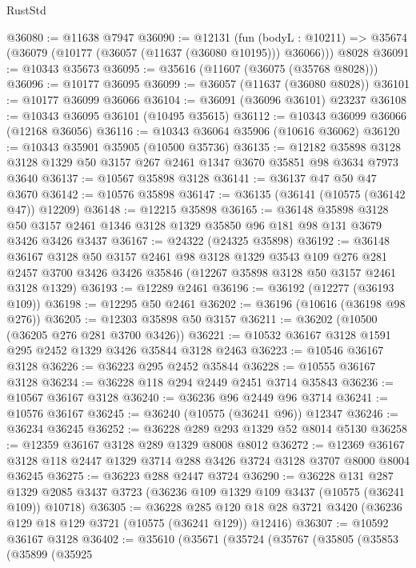\begin{lexlean}{RustStd}
\begin{coremodule}
@36080 := @11638 @7947
@36090 := @12131
    (fun (bodyL : @10211) => @35674 (@36079 (@10177 (@36057 (@11637 (@36080 @10195))) @36066)))
    @8028
@36091 := @10343 @35673
@36095 := @35616 (@11607 (@36075 (@35768 @8028)))
@36096 := @10177 @36095
@36099 := @36057 (@11637 (@36080 @8028))
@36101 := @10177 @36099 @36066
@36104 := @36091 (@36096 @36101) @23237
@36108 := @10343 @36095 @36101 (@10495 @35615)
@36112 := @10343 @36099 @36066 (@12168 @36056)
@36116 := @10343 @36064 @35906 (@10616 @36062)
@36120 := @10343 @35901 @35905 (@10500 @35736)
@36135 := @12182
    @35898
    @3128
    @3128
    @1329
    @50
    @3157
    @267
    @2461
    @1347
    @3670
    @35851
    @98
    @3634
    @7973
    @3640
@36137 := @10567 @35898 @3128
@36141 := @36137 @47 @50 @47 @3670
@36142 := @10576 @35898
@36147 := @36135 (@36141 (@10575 (@36142 @47)) @12209)
@36148 := @12215 @35898
@36165 := @36148
    @35898
    @3128
    @50
    @3157
    @2461
    @1346
    @3128
    @1329
    @35850
    @96
    @181
    @98
    @131
    @3679
    @3426
    @3426
    @3437
@36167 := @24322 (@24325 @35898)
@36192 := @36148
    @36167
    @3128
    @50
    @3157
    @2461
    @98
    @3128
    @1329
    @3543
    @109
    @276
    @281
    @2457
    @3700
    @3426
    @3426
    @35846
    (@12267 @35898 @3128 @50 @3157 @2461 @3128 @1329)
@36193 := @12289 @2461
@36196 := @36192 (@12277 (@36193 @109))
@36198 := @12295 @50 @2461
@36202 := @36196 (@10616 (@36198 @98 @276))
@36205 := @12303 @35898 @50 @3157
@36211 := @36202 (@10500 (@36205 @276 @281 @3700 @3426))
@36221 := @10532 @36167 @3128 @1591 @295 @2452 @1329 @3426 @35844 @3128 @2463
@36223 := @10546 @36167 @3128
@36226 := @36223 @295 @2452 @35844
@36228 := @10555 @36167 @3128
@36234 := @36228 @118 @294 @2449 @2451 @3714 @35843
@36236 := @10567 @36167 @3128
@36240 := @36236 @96 @2449 @96 @3714
@36241 := @10576 @36167
@36245 := @36240 (@10575 (@36241 @96)) @12347
@36246 := @36234 @36245
@36252 := @36228 @289 @293 @1329 @52 @8014 @5130
@36258 := @12359 @36167 @3128 @289 @1329 @8008 @8012
@36272 := @12369 @36167 @3128 @118 @2447 @1329 @3714 @288 @3426 @3724 @3128 @3707 @8000 @8004 @36245
@36275 := @36223 @288 @2447 @3724
@36290 := @36228
    @131
    @287
    @1329
    @2085
    @3437
    @3723
    (@36236 @109 @1329 @109 @3437 (@10575 (@36241 @109)) @10718)
@36305 := @36228
    @285
    @120
    @18
    @28
    @3721
    @3420
    (@36236 @129 @18 @129 @3721 (@10575 (@36241 @129)) @12416)
@36307 := @10592 @36167 @3128
@36402 := @35610
    (@35671
      (@35724
        (@35767
          (@35805
            (@35853
              (@35899
                (@35925

\end{coremodule}
\end{lexlean}
